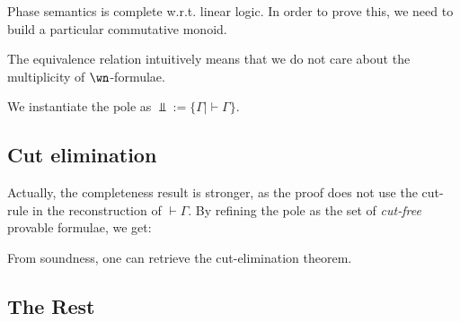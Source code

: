 Phase semantics is complete w.r.t. linear logic. In order to prove this,
we need to build a particular commutative monoid.

The equivalence relation intuitively means that we do not care about the
multiplicity of \(\wn\)-formulae.

We instantiate the pole as \(\Bot := \{\Gamma \mid \vdash\Gamma\}\).

\subsection{Cut elimination}\label{cut-elimination}

Actually, the completeness result is stronger, as the proof does not use
the cut-rule in the reconstruction of \(\vdash\Gamma\). By refining the
pole as the set of \emph{cut-free} provable formulae, we get:

From soundness, one can retrieve the cut-elimination theorem.

\subsection{The Rest}\label{the-rest}


